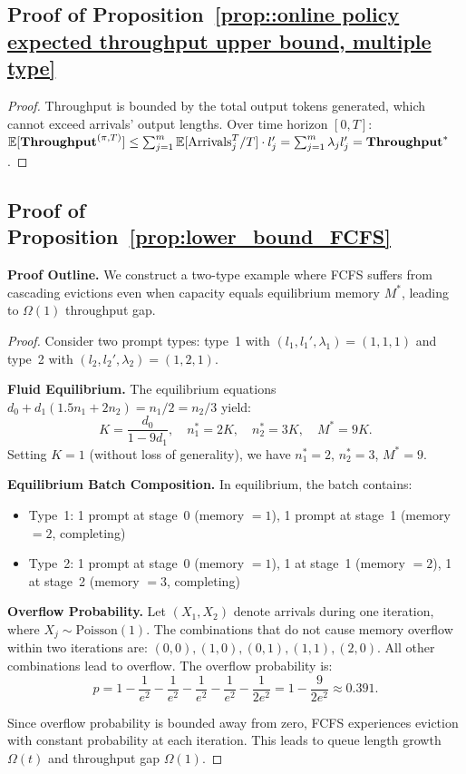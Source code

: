 \subsection{Proof of Proposition~\ref{prop::online policy expected throughput upper bound, multiple type}}
\label{appendix:proof_throughput_upper_bound}

\begin{proof}
Throughput is bounded by the total output tokens generated, which cannot exceed arrivals' output lengths. Over time horizon $[0,T]$: $\mathbb{E}[\textbf{Throughput}^{(\pi,T)}] \leq \sum_{j=1}^m \mathbb{E}[\text{Arrivals}_j^T/T] \cdot l_j' = \sum_{j=1}^m \lambda_j l_j' = \textbf{Throughput}^*$.
\end{proof}

\subsection{Proof of Proposition~\ref{prop:lower_bound_FCFS}}
\label{appendix:proof_fcfs_lower_bound}

\noindent\textbf{Proof Outline.} We construct a two-type example where FCFS suffers from cascading evictions even when capacity equals equilibrium memory $M^*$, leading to $\Omega(1)$ throughput gap.

\begin{proof}
Consider two prompt types: type~1 with $(l_1, l_1', \lambda_1) = (1, 1, 1)$ and type~2 with $(l_2, l_2', \lambda_2) = (1, 2, 1)$.

\textbf{Fluid Equilibrium.} The equilibrium equations $d_0 + d_1(1.5n_1 + 2n_2) = n_1/2 = n_2/3$ yield:
$$K = \frac{d_0}{1-9d_1}, \quad n_1^* = 2K, \quad n_2^* = 3K, \quad M^* = 9K.$$
Setting $K = 1$ (without loss of generality), we have $n_1^* = 2$, $n_2^* = 3$, $M^* = 9$.

\textbf{Equilibrium Batch Composition.} In equilibrium, the batch contains:
\begin{itemize}
\item Type~1: 1 prompt at stage~0 (memory $= 1$), 1 prompt at stage~1 (memory $= 2$, completing)
\item Type~2: 1 prompt at stage~0 (memory $= 1$), 1 at stage~1 (memory $= 2$), 1 at stage~2 (memory $= 3$, completing)
\end{itemize}

\textbf{Overflow Probability.} Let $(X_1, X_2)$ denote arrivals during one iteration, where $X_j \sim \text{Poisson}(1)$. The combinations that do not cause memory overflow within two iterations are: $(0,0), (1,0), (0,1), (1,1), (2,0)$. All other combinations lead to overflow. The overflow probability is:
$$p = 1 - \frac{1}{e^2} - \frac{1}{e^2} - \frac{1}{e^2} - \frac{1}{e^2} - \frac{1}{2e^2} = 1 - \frac{9}{2e^2} \approx 0.391.$$

Since overflow probability is bounded away from zero, FCFS experiences eviction with constant probability at each iteration. This leads to queue length growth $\Omega(t)$ and throughput gap $\Omega(1)$.
\end{proof}

